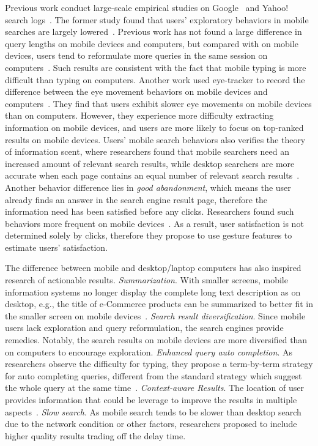 Previous work conduct large-scale empirical studies on Google~\cite{kamvar2006large} and Yahoo! search logs~\cite{yi2008deciphering}. The former study found that users' exploratory behaviors in mobile searches are largely lowered~\cite{kamvar2006large}. Previous work has not found a large difference in query lengths on mobile devices and computers, but compared with on mobile devices, users tend to reformulate more queries in the same session on computers~\cite{kamvar2006large}. Such results are consistent with the fact that mobile typing is more difficult than typing on computers. Another work used eye-tracker to record the difference between the eye movement behaviors on mobile devices and computers~\cite{kim2015eye}. They find that users exhibit slower eye movements on mobile devices than on computers. However, they experience more difficulty extracting information on mobile devices, and users are more likely to focus on top-ranked results on mobile devices. Users' mobile search behaviors also verifies the theory of information scent, where researchers found that mobile searchers need an increased amount of relevant search results, while desktop searchers are more accurate when each page contains an equal number of relevant search results~\cite{ong2017using}. Another behavior difference lies in \emph{good abandonment}, which means the user already finds an answer in the search engine result page, therefore the information need has been satisfied before any clicks. Researchers found such behaviors more frequent on mobile devices~\cite{williams2016detecting}. As a result, user satisfaction is not determined solely by clicks, therefore they propose to use gesture features to estimate users' satisfaction.  

The difference between mobile and desktop/laptop computers has also inspired research of actionable results. \emph{Summarization}. With smaller screens, mobile information systems no longer display the complete long text description as on desktop, e.g., the title of e-Commerce products can be summarized to better fit in the smaller screen on mobile devices~\cite{sun2018multi}. \emph{Search result diversification}. Since mobile users lack exploration and query reformulation, the search engines provide remedies. Notably, the search results on mobile devices are more diversified than on computers to encourage exploration. \emph{Enhanced query auto completion}. As researchers observe the difficulty for typing, they propose a term-by-term strategy for auto completing queries, different from the standard strategy which suggest the whole query at the same time~\cite{vargas2016term}. \emph{Context-aware Results}. The location of user provides information that could be leverage to improve the results in multiple aspects~\cite{lin2017location}. \emph{Slow search}. As mobile search tends to be slower than desktop search due to the network condition or other factors, researchers proposed to include higher quality results trading off the delay time.

